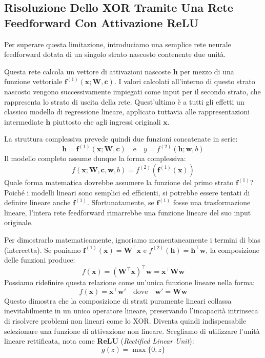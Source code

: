﻿\documentclass[11pt, a4paper]{article}
\begin{document}
\subsection{Risoluzione Dello XOR Tramite Una Rete Feedforward Con Attivazione ReLU}

Per superare questa limitazione, introduciamo una semplice rete neurale feedforward dotata di un singolo strato nascosto contenente due unità.


Questa rete calcola un vettore di attivazioni nascoste $\bm{h}$ per mezzo di una funzione vettoriale $\bm{f}^{(1)}(\bm{x}; \bm{W}, \bm{c})$. I valori calcolati all'interno di questo strato nascosto vengono successivamente impiegati come input per il secondo strato, che rappresenta lo strato di uscita della rete. Quest'ultimo è a tutti gli effetti un classico modello di regressione lineare, applicato tuttavia alle rappresentazioni intermediate $\bm{h}$ piuttosto che agli ingressi originali $\bm{x}$.

La struttura complessiva prevede quindi due funzioni concatenate in serie:
\[
\bm{h} = \bm{f}^{(1)}(\bm{x}; \bm{W}, \bm{c}) \quad \text{e} \quad y = f^{(2)}(\bm{h}; \bm{w}, b)
\]
Il modello completo assume dunque la forma complessiva:
\[
f(\bm{x}; \bm{W}, \bm{c}, \bm{w}, b) = f^{(2)}\left(\bm{f}^{(1)}(\bm{x})\right)
\]
Quale forma matematica dovrebbe assumere la funzione del primo strato $\bm{f}^{(1)}$? Poiché i modelli lineari sono semplici ed efficienti, si potrebbe essere tentati di definire lineare anche $\bm{f}^{(1)}$. Sfortunatamente, se $\bm{f}^{(1)}$ fosse una trasformazione lineare, l'intera rete feedforward rimarrebbe una funzione lineare del suo input originale.

Per dimostrarlo matematicamente, ignoriamo momentaneamente i termini di bias (intercetta). Se poniamo $\bm{f}^{(1)}(\bm{x}) = \bm{W}^\top \bm{x}$ e $f^{(2)}(\bm{h}) = \bm{h}^\top \bm{w}$, la composizione delle funzioni produce:
\[
f(\bm{x}) = \left( \bm{W}^\top \bm{x} \right)^\top \bm{w} = \bm{x}^\top \bm{W} \bm{w}
\]
Possiamo ridefinire questa relazione come un'unica funzione lineare nella forma:
\[
f(\bm{x}) = \bm{x}^\top \bm{w}' \quad \text{dove} \quad \bm{w}' = \bm{W}\bm{w}
\]
Questo dimostra che la composizione di strati puramente lineari collassa inevitabilmente in un unico operatore lineare, preservando l'incapacità intrinseca di risolvere problemi non lineari come lo XOR. Diventa quindi indispensabile selezionare una funzione di attivazione non lineare. Scegliamo di utilizzare l'unità lineare rettificata, nota come \textbf{ReLU} (\emph{Rectified Linear Unit}):
\[
g(z) = \max\{0, z\}
\]
\end{document}

